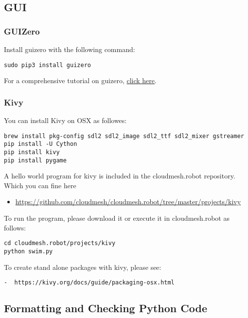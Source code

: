 \subsection{GUI}\label{gui}

\subsubsection{GUIZero}\label{guizero}

Install guizero with the following command:

\begin{verbatim}
sudo pip3 install guizero
\end{verbatim}

For a comprehensive tutorial on guizero,
\href{https://lawsie.github.io/guizero/howto/}{click here}.

\subsubsection{Kivy}\label{kivy}

You can install Kivy on OSX as followes:

\begin{verbatim}
brew install pkg-config sdl2 sdl2_image sdl2_ttf sdl2_mixer gstreamer
pip install -U Cython
pip install kivy
pip install pygame
\end{verbatim}

A hello world program for kivy is included in the cloudmesh.robot
repository. Which you can fine here

\begin{itemize}
\tightlist
\item
  \url{https://github.com/cloudmesh/cloudmesh.robot/tree/master/projects/kivy}
\end{itemize}

To run the program, please download it or execute it in cloudmesh.robot
as follows:

\begin{verbatim}
cd cloudmesh.robot/projects/kivy
python swim.py
\end{verbatim}

To create stand alone packages with kivy, please see:

\begin{verbatim}
-  https://kivy.org/docs/guide/packaging-osx.html
\end{verbatim}

\subsection{Formatting and Checking Python
Code}\label{formatting-and-checking-python-code}

